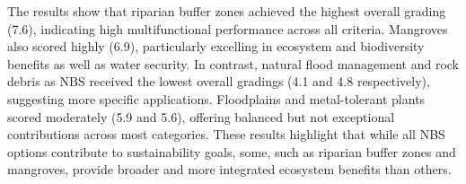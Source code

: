 \begin{table}[H]
  \centering
  \caption{Grading by the seven NBS goals}
  \label{tab:gradingmatrix}
  \small
  \renewcommand{\arraystretch}{1.15}
  \setlength{\tabcolsep}{3pt}

\end{table}

The results show that riparian buffer zones achieved the highest overall grading (7.6), indicating high multifunctional performance across all criteria. Mangroves also scored highly (6.9), particularly excelling in ecosystem and biodiversity benefits as well as water security. In contrast, natural flood management and rock debris as NBS received the lowest overall gradings (4.1 and 4.8 respectively), suggesting more specific applications. Floodplains and metal-tolerant plants scored moderately (5.9 and 5.6), offering balanced but not exceptional contributions across most categories. These results highlight that while all NBS options contribute to sustainability goals, some, such as riparian buffer zones and mangroves, provide broader and more integrated ecosystem benefits than others.

